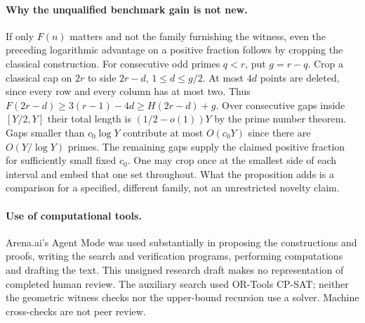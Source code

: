 \documentclass[11pt]{article}
\begin{document}
\paragraph{Why the unqualified benchmark gain is not new.} If only $F(n)$ matters and not the family furnishing the witness, even the preceding logarithmic advantage on a positive fraction follows by cropping the classical construction. For consecutive odd primes $q<r$, put $g=r-q$. Crop a classical cap on $2r$ to side $2r-d$, $1\le d\le g/2$. At most $4d$ points are deleted, since every row and every column has at most two. Thus $F(2r-d)\ge3(r-1)-4d\ge H(2r-d)+g$. Over consecutive gaps inside $[Y/2,Y]$ their total length is $(1/2-o(1))Y$ by the prime number theorem. Gaps smaller than $c_0\log Y$ contribute at most $O(c_0Y)$ since there are $O(Y/\log Y)$ primes. The remaining gaps supply the claimed positive fraction for sufficiently small fixed $c_0$. One may crop once at the smallest side of each interval and embed that one set throughout. What the proposition adds is a comparison for a specified, different family, not an unrestricted novelty claim.

\paragraph{Use of computational tools.} Arena.ai's Agent Mode was used substantially in proposing the constructions and proofs, writing the search and verification programs, performing computations and drafting the text. This unsigned research draft makes no representation of completed human review. The auxiliary search used OR-Tools CP-SAT; neither the geometric witness checks nor the upper-bound recursion use a solver. Machine cross-checks are not peer review.
\end{document}
